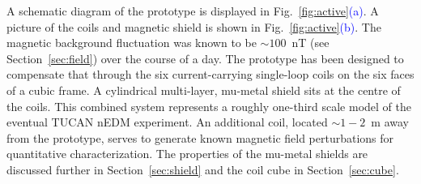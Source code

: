 




A schematic diagram of the prototype is displayed in Fig.~\ref{fig:active}\textcolor{blue}{(a)}. A picture of the coils and magnetic shield is shown in Fig.~\ref{fig:active}\textcolor{blue}{(b)}. The magnetic background fluctuation was known to be $\sim100$~nT (see Section~\ref{sec:field}) over the course of a day. The prototype has been designed to compensate that through the six current-carrying single-loop coils on the six faces of a cubic frame. A cylindrical multi-layer, mu-metal shield sits at the centre of the coils. This combined system represents a roughly one-third scale model of the eventual TUCAN nEDM experiment. An additional coil, located $\sim1-2$~m away from the prototype, serves to generate known magnetic field perturbations for quantitative characterization. The properties of the mu-metal shields are discussed further in Section~\ref{sec:shield} and the coil cube in Section~\ref{sec:cube}. 

